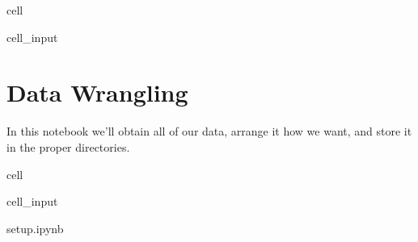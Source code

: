 \documentclass[letterpaper,10pt,english]{jupyterBook}
\begin{document}
\begin{sphinxuseclass}{cell}
\begin{sphinxVerbatimInput}
\begin{sphinxuseclass}{cell_input}
\begin{sphinxVerbatim}[commandchars=\\\{\}]
            
            
            \PYG{p}{[} \PYG{p}{]}



         
\end{sphinxVerbatim}

\end{sphinxuseclass}\end{sphinxVerbatimInput}

\end{sphinxuseclass}
\sphinxstepscope


\part{Data Wrangling}
\label{\detokenize{notebooks/SL_Data_Wrangling:data-wrangling}}\label{\detokenize{notebooks/SL_Data_Wrangling::doc}}
\sphinxAtStartPar
In this notebook we’ll obtain all of our data, arrange it how we want, and store it in the proper directories.

\begin{sphinxuseclass}{cell}\begin{sphinxVerbatimInput}

\begin{sphinxuseclass}{cell_input}
\begin{sphinxVerbatim}[commandchars=\\\{\}]
 setup.ipynb
  
  
\end{sphinxVerbatim}

\end{sphinxuseclass}\end{sphinxVerbatimInput}

\end{sphinxuseclass}
\end{document}

